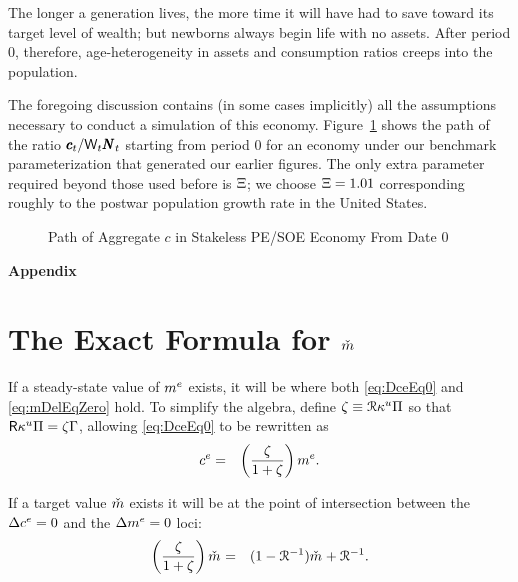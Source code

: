 \documentclass{handout}
\begin{document}
The longer a generation lives, the more time it will have had to save toward
its target level of wealth; but newborns always begin life with no assets.  After period 0, therefore, age-heterogeneity in assets and consumption ratios creeps into the population.

The foregoing discussion contains (in some cases implicitly) all the
assumptions necessary to conduct a simulation of this economy.
Figure~\ref{fig:SOENoStakescPath} shows the path of the ratio $\pmb{c}_{t}/\mathsf{W}_{t}\pmb{N}_{t}$ starting from
period 0 for an economy under our benchmark parameterization that generated
our earlier figures.  The
only extra parameter required beyond those used before is $\Xi$; we choose $\Xi=1.01$ corresponding
roughly to the postwar population growth rate in the United States.

\begin{figure}
\caption{Path of Aggregate $c$ in Stakeless PE/SOE Economy From Date 0}
\label{fig:SOENoStakescPath}
\end{figure}




\pagebreak\appendix
\centerline{\bf \LARGE Appendix}

\setcounter{section}{0}

\section{The Exact Formula for $\mTarg^{\null}$}

If a steady-state value of $m^{e}$ exists, it will be where both
\eqref{eq:DceEq0} and \eqref{eq:mDelEqZero} hold.  To
simplify the algebra, define $\zeta \equiv \mathcal{R} \kappa^{u} \Pi$ so
that $\mathsf{R} \kappa^{u} \Pi = \zeta \Gamma$, allowing \eqref{eq:DceEq0} 
to be rewritten as 
\begin{eqnarray}
  \cRatE_{\tSS} & = & \left(\frac{\zeta }{1+\zeta}\right)\mRatE .
\end{eqnarray}

If a target value $\check{m}$ exists it will be at the point of intersection between the $\Delta c^{e} = 0$ and the $\Delta m^{e}=0$ loci:
\begin{eqnarray}
  \left(\frac{\zeta}{1+\zeta}\right)\mTarg^{\null} & = & (1-\Rnorm^{-1})\mTarg^{\null}+\Rnorm^{-1}.
\end{eqnarray}
\end{document}
